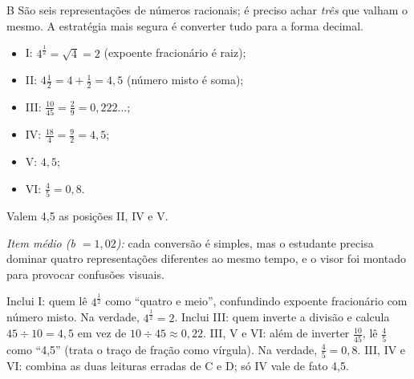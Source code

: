\begin{resolucao}{B}
 São seis representações de números racionais; é preciso achar
\emph{três} que valham o mesmo. A estratégia mais segura é converter tudo para a forma decimal.
\begin{itemize}[leftmargin=1.4em,itemsep=1pt,topsep=2pt]
  \item I: $4^{\frac{1}{2}}=\sqrt{4}=2$ (expoente fracionário é raiz);
  \item II: $4\frac{1}{2}=4+\frac{1}{2}=4,5$ (número misto é soma);
  \item III: $\frac{10}{45}=\frac{2}{9}=0,222\ldots$;
  \item IV: $\frac{18}{4}=\frac{9}{2}=4,5$;
  \item V: $4,5$;
  \item VI: $\frac{4}{5}=0,8$.
\end{itemize}
 Valem 4,5 as posições II, IV e V.

\textit{Item médio (b $=1,02$):} cada conversão é simples, mas o estudante precisa dominar quatro
representações diferentes ao mesmo tempo, e o visor foi montado para provocar confusões visuais.
\begin{distratores}
 Inclui I: quem lê $4^{\frac{1}{2}}$ como ``quatro e meio'', confundindo expoente
fracionário com número misto. Na verdade, $4^{\frac{1}{2}}=2$.
 Inclui III: quem inverte a divisão e calcula $45\div 10=4,5$ em vez de $10\div 45\approx 0,22$.
 III, V e VI: além de inverter $\frac{10}{45}$, lê $\frac{4}{5}$ como ``4,5'' (trata o traço
de fração como vírgula). Na verdade, $\frac{4}{5}=0,8$.
 III, IV e VI: combina as duas leituras erradas de C e D; só IV vale de fato 4,5.
\end{distratores}
\end{resolucao}

